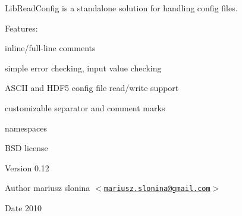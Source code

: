 LibReadConfig is a standalone solution for handling config files.

Features:
\begin{DoxyItemize}
\item inline/full-\/line comments
\item simple error checking, input value checking
\item ASCII and HDF5 config file read/write support
\item customizable separator and comment marks
\item namespaces
\end{DoxyItemize}

BSD license

\begin{DoxyVersion}{Version}
0.12
\end{DoxyVersion}
\begin{DoxyAuthor}{Author}
mariusz slonina $<$\href{mailto:mariusz.slonina@gmail.com}{\tt mariusz.slonina@gmail.com}$>$ 
\end{DoxyAuthor}
\begin{DoxyDate}{Date}
2010 
\end{DoxyDate}
